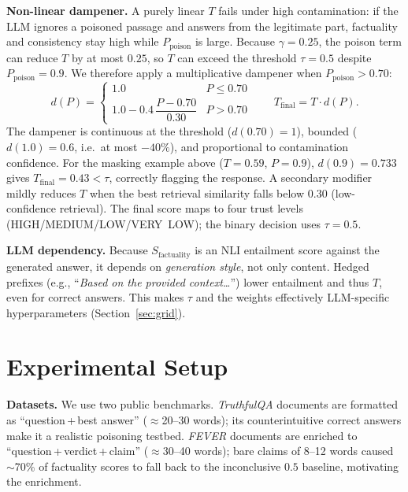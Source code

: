 \documentclass[conference]{IEEEtran}
\begin{document}
\textbf{Non-linear dampener.} A purely linear $T$ fails under high
contamination: if the LLM ignores a poisoned passage and answers from the
legitimate part, factuality and consistency stay high while $P_{\text{poison}}$
is large. Because $\gamma{=}0.25$, the poison term can reduce $T$ by at most
$0.25$, so $T$ can exceed the threshold $\tau{=}0.5$ despite $P_{\text{poison}}
{=}0.9$. We therefore apply a multiplicative dampener when
$P_{\text{poison}}>0.70$:
\begin{equation}
\label{eq:damp}
d(P) =
\begin{cases}
1.0 & P \le 0.70\\[2pt]
1.0 - 0.4\,\dfrac{P-0.70}{0.30} & P > 0.70
\end{cases}
\qquad T_{\text{final}} = T\cdot d(P).
\end{equation}
The dampener is continuous at the threshold ($d(0.70){=}1$), bounded
($d(1.0){=}0.6$, i.e.\ at most $-40\%$), and proportional to contamination
confidence. For the masking example above ($T{=}0.59$, $P{=}0.9$),
$d(0.9){=}0.733$ gives $T_{\text{final}}{=}0.43<\tau$, correctly flagging the
response. A secondary modifier mildly reduces $T$ when the best retrieval
similarity falls below $0.30$ (low-confidence retrieval). The final score maps
to four trust levels (HIGH/MEDIUM/LOW/VERY~LOW); the binary decision uses
$\tau{=}0.5$.

\textbf{LLM dependency.} Because $S_{\text{factuality}}$ is an NLI entailment
score against the generated answer, it depends on \emph{generation style}, not
only content. Hedged prefixes (e.g., ``\emph{Based on the provided
context\dots}'') lower entailment and thus $T$, even for correct answers. This
makes $\tau$ and the weights effectively LLM-specific hyperparameters
(Section~\ref{sec:grid}).

\section{Experimental Setup}
\textbf{Datasets.} We use two public benchmarks. \emph{TruthfulQA}
\cite{lin2022truthfulqa} documents are formatted as ``question\,+\,best
answer'' ($\approx$20--30 words); its counterintuitive correct answers make it a
realistic poisoning testbed. \emph{FEVER} \cite{thorne2018fever} documents are
enriched to ``question\,+\,verdict\,+\,claim'' ($\approx$30--40 words); bare
claims of 8--12 words caused $\sim$70\% of factuality scores to fall back to the
inconclusive $0.5$ baseline, motivating the enrichment.
\end{document}
